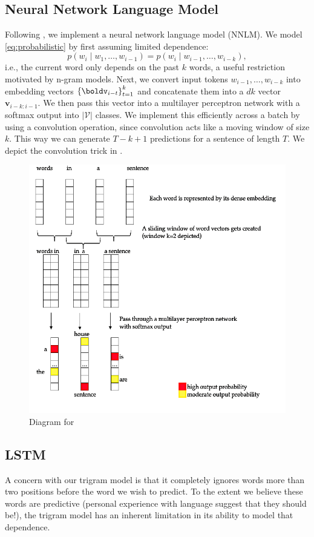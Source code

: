 \documentclass[12pt]{article}
\begin{document}
\subsection{Neural Network Language Model}
\label{sub:nnlm}
Following \cite{bengio2003neural}, we implement a neural network language model
(NNLM). We model \eqref{eq:probabilistic} by first assuming limited dependence: \[
p(w_i \mid w_1,\ldots,w_{i-1}) = p(w_i \mid w_{i-1}, \ldots, w_{i-k}),
\]
i.e., the current word only depends on the past $k$ words, a useful restriction
motivated by n-gram models. Next, we convert input tokens $w_{i-1},\ldots,w_
{i-k}$ into embedding vectors $\br{\boldv_{i-t}}_{t=1}^k$ and concatenate them
into a $dk$ vector $\bm v_{i-k:i-1}$. We then pass this vector into a
multilayer perceptron network with a softmax output into $|\mathcal V|$ classes.
We implement this efficiently across a batch by using a convolution operation,
since convolution acts like a moving window of size $k$. This way we can
generate $T - k + 1$ predictions for a sentence of length $T$. We depict the
convolution trick in .

\begin{figure}[tb]
    \centering
    \includegraphics[width=.7\textwidth]{figs/nnlang.png}
    \caption{Diagram for }
    \label{fig:nnlm}
\end{figure}

\subsection{LSTM}
\label{subsec:lstm}

A concern with our trigram model is that it completely ignores words more than
two positions before the word we wish to predict. To the extent we believe these
words are predictive (personal experience with language suggest that they should
be!), the trigram model has an inherent limitation in its ability to model that
dependence.
\end{document}
